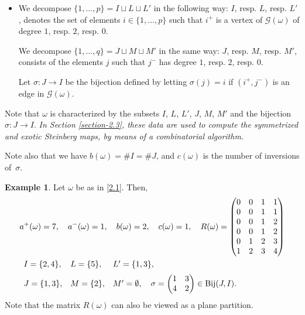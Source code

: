 \documentclass[11pt]{article}
\theoremstyle{definition}
\newtheorem{exam}[theo]{Example}
\numberwithin{equation}{section}
\newcommand{\card}[1]{\# #1}
\begin{document}
\begin{itemize}
\item We decompose $\{1,\ldots,p\}=I\sqcup L\sqcup L'$ in the following way:
$I$, resp. $L$, resp. $L'$, denotes the set of elements $i\in\{1,\ldots,p\}$ such that $i^+$ is a vertex of $\mathcal{G}(\omega)$ of degree $1$, resp. $2$, resp. $0$.

We decompose $\{1,\ldots,q\}=J\sqcup M\sqcup M'$ in the same way: $J$, resp. $M$, resp. $M'$, consists of the elements $j$ such that $j^-$ has degree $1$, resp. $2$, resp. $0$.

Let $\sigma:J\to I$ be the bijection defined by letting $\sigma(j)=i$ if $(i^+,j^-)$ is an edge in $\mathcal{G}(\omega)$.
\end{itemize}
Note that $\omega$ is characterized by the subsets $I$, $L$, $L'$, $J$, $M$, $M'$ and the bijection $\sigma:J\to I$.
{\em In Section \ref{section-2.3},
these data are used to compute
the symmetrized and exotic Steinberg maps, by means of a combinatorial algorithm.}

Note also that we have $b(\omega)=\card{I}=\card{J}$, and $c(\omega)$ is the number of inversions of~$\sigma$.



\begin{exam}
\label{E2.1}
Let $\omega$ be as in \eqref{2.1}. Then,
\begin{eqnarray*}
 & a^+(\omega)=7,\quad a^-(\omega)=1,\quad b(\omega)=2,\quad c(\omega)=1, \quad
R(\omega)=\mbox{\tiny $\begin{pmatrix} 0 & 0 & 1 & 1\\ 0 & 0 & 1 & 1\\ 0 & 0 & 1 & 2\\ 0 & 0 & 1 & 2\\ 0 & 1 & 2 & 3\\ 1 & 2 & 3 & 4 \end{pmatrix}$}\\
&
\begin{array}{llll}
I=\{2,4\}, & L=\{5\}, & L'=\{1,3\},\\[2mm]
J=\{1,3\}, & M=\{2\}, & M'=\emptyset,
\quad\sigma=\begin{pmatrix} 1 & 3\\ 4 & 2 \end{pmatrix}\in\mathrm{Bij}(J,I).
\end{array}
\end{eqnarray*}
Note that the matrix $R(\omega)$ can also be viewed as a plane partition.
\end{exam}
\end{document}
